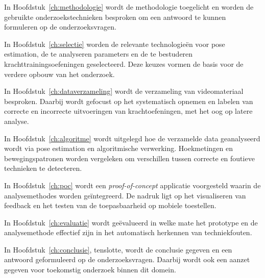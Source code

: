 In Hoofdstuk~\ref{ch:methodologie} wordt de methodologie toegelicht en worden de gebruikte onderzoekstechnieken besproken om een antwoord te kunnen formuleren op de onderzoeksvragen.

In Hoofdstuk~\ref{ch:selectie} worden de relevante technologieën voor pose estimation, de te analyseren parameters en de te bestuderen krachttrainingsoefeningen geselecteerd. Deze keuzes vormen de basis voor de verdere opbouw van het onderzoek.

In Hoofdstuk~\ref{ch:dataverzameling} wordt de verzameling van videomateriaal besproken. Daarbij wordt gefocust op het systematisch opnemen en labelen van correcte en incorrecte uitvoeringen van krachtoefeningen, met het oog op latere analyse.

In Hoofdstuk~\ref{ch:algoritme} wordt uitgelegd hoe de verzamelde data geanalyseerd wordt via pose estimation en algoritmische verwerking. Hoekmetingen en bewegingspatronen worden vergeleken om verschillen tussen correcte en foutieve technieken te detecteren.

In Hoofdstuk~\ref{ch:poc} wordt een \textit{proof-of-concept} applicatie voorgesteld waarin de analysemethodes worden geïntegreerd. De nadruk ligt op het visualiseren van feedback en het testen van de toepasbaarheid op mobiele toestellen.

In Hoofdstuk~\ref{ch:evaluatie} wordt geëvalueerd in welke mate het prototype en de analysemethode effectief zijn in het automatisch herkennen van techniekfouten. 

In Hoofdstuk~\ref{ch:conclusie}, tenslotte, wordt de conclusie gegeven en een antwoord geformuleerd op de onderzoeksvragen. Daarbij wordt ook een aanzet gegeven voor toekomstig onderzoek binnen dit domein.